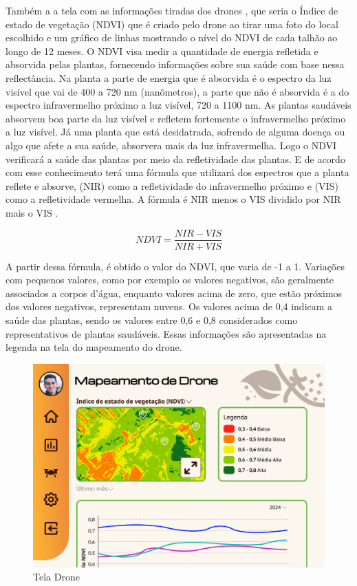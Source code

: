 Também a a tela com as informações tiradas dos drones , que seria o Índice de  estado de vegetação (NDVI) que é criado pelo drone ao tirar uma foto do local escolhido e um gráfico de linhas mostrando o nível do NDVI de cada talhão ao longo de 12 meses. O NDVI visa medir a quantidade de energia refletida e absorvida pelas plantas, fornecendo informações sobre sua saúde com base nessa reflectância. Na planta a parte de energia que é absorvida é o espectro da luz visível que vai de 400 a 720 nm (nanômetros), a parte que não é absorvida é a do espectro infravermelho próximo a luz visível, 720 a 1100 nm. As plantas saudáveis absorvem boa parte da luz visível e refletem fortemente o infravermelho próximo a luz visível. Já uma planta que está desidatrada, sofrendo de alguma doença ou algo que afete a sua saúde, absorvera mais da luz infravermelha. Logo o NDVI verificará a saúde das plantas por meio da refletividade das plantas. E de acordo com esse conhecimento terá uma fórmula que utilizará dos espectros que a planta reflete e absorve, (NIR) como a refletividade do infravermelho próximo e (VIS) como a refletividade vermelha. A fórmula é NIR menos o VIS dividido por NIR mais o VIS \cite{ResultadoNDVIArtigo, ResultadoNDVISite}.  

\[ NDVI =  \frac{NIR - VIS}{NIR + VIS} \]

A partir dessa fórmula, é obtido o valor do NDVI, que varia de -1 a 1. Variações com pequenos valores, como por exemplo os valores negativos, são geralmente associados a corpos d'água, enquanto valores acima de zero, que estão próximos dos valores negativos, representam nuvens. Os valores acima de 0,4 indicam a saúde das plantas, sendo os valores entre 0,6 e 0,8 considerados como representativos de plantas saudáveis. Essas informações são apresentadas na legenda na tela do mapeamento do drone.

\begin{figure}[H]
\centering
\caption{Tela Drone}%
\label{fig:tela-drone}
\includegraphics[width=0.8\linewidth]{Illustrations/tela-drone.png}
\end{figure}

